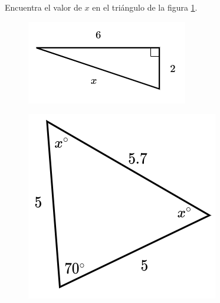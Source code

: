 Encuentra el valor de $x$ en el triángulo de la figura \ref{fig:lados_pitagoras_21}.

\begin{minipage}[t][][t]{0.35\textwidth}
    \begin{figure}[H]
        \centering
        \includegraphics[width=0.9\linewidth]{../images/lados_pitagoras_21.png}

        \caption{}
        \label{fig:lados_pitagoras_21}
    \end{figure}
\end{minipage}\hfill
\begin{minipage}[t][][t]{0.6\textwidth}
    \begin{solutionbox}{8cm}
        \begin{minipage}{0.9\linewidth}
            \begin{figure}[H]
                \centering
                \includegraphics[width=0.9\linewidth]{../images/findangle10a.png}
                \caption{}
                \label{fig:findangle10a}
            \end{figure}
        \end{minipage}\hfill
        \begin{minipage}{0.65\textwidth}

        \end{minipage}
    \end{solutionbox}
\end{minipage}
